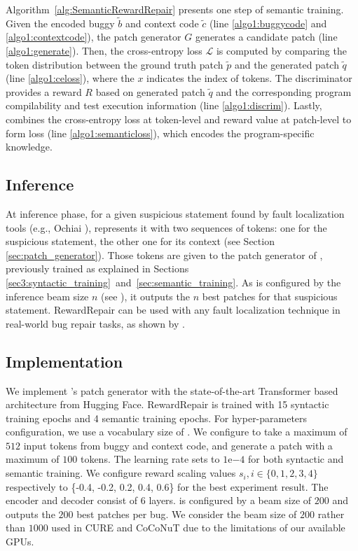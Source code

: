 Algorithm~\autoref{alg:SemanticRewardRepair}  presents one step of semantic training. 
Given the encoded buggy $\widetilde{b}$ and context code $\widetilde{c}$ (line \ref{algo1:buggycode} and \ref{algo1:contextcode}), the patch generator $G$ generates a candidate patch (line \ref{algo1:generate}).
Then, the cross-entropy loss $\mathcal{L}$ is computed by comparing the token distribution between the ground truth patch $\widetilde{p}$ and the generated patch $ \widetilde{q}$ (line \ref{algo1:celoss}), where the $x$ indicates the index of tokens.
The discriminator provides a reward $R$ based on generated patch  $ \widetilde{q}$ and the corresponding program compilability and test execution information (line \ref{algo1:discrim}). 
Lastly, \approach combines the cross-entropy loss at token-level  and reward value at patch-level  to form \approach loss (line \ref{algo1:semanticloss}), which encodes the program-specific knowledge. 

\subsection{Inference}
\label{sec:inferencephase}

At inference phase, for a given suspicious statement found by fault localization tools (e.g., Ochiai \cite{fl-tool}), \approach{} represents it with two sequences of tokens: one for the suspicious statement, the other one for its context (see Section \ref{sec:patch_generator}).
Those tokens are given to the patch generator of \approach{}, previously trained as explained in Sections~ \ref{sec3:syntactic_training}~and~\ref{sec:semantic_training}.
As  \approach is configured by the inference beam size $n$ (see \cite{CURE-icse21,SEQUENCER}), it outputs  the $n$ best patches for that suspicious statement.
RewardRepair can be used with any fault localization technique in  real-world bug repair tasks, as shown by \cite{Rhero}. 

\subsection{Implementation}
\label{sec-implementation}

We implement \approach's patch generator  with the state-of-the-art Transformer based architecture \cite{T5} from Hugging Face. 
RewardRepair is trained with 15 syntactic training epochs and 4 semantic training epochs. 
For hyper-parameters configuration, we use a vocabulary size of .
We configure \approach to take a maximum of $512$ input tokens from buggy and context code, and generate a patch with a maximum of $100$ tokens. 
The learning rate sets to $1\mathrm{e}{-4}$ for both syntactic and semantic training. We configure reward scaling values $s_{i}, i \in \{0,1,2,3,4\}$ respectively to \{-0.4, -0.2, 0.2, 0.4, 0.6\} for the best experiment result. 
The encoder and decoder consist of 6 layers.
 \approach is configured by a beam size of $200$ and outputs the $200$ best patches per bug. We consider the beam size of $200$ rather than $1000$ used in CURE \cite{CURE-icse21} and CoCoNuT \cite{CoCoNuT} due to the limitations of our available GPUs.

